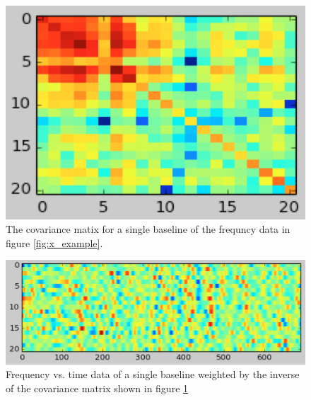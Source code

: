 \documentclass[twocolumn,numberedappendix]{emulateapj}
\begin{document}
\begin{figure}[h!]\centering
\includegraphics[width=\columnwidth, height=.8\columnwidth]{plots/C_example.png}
\caption{The covariance matix for a single baseline of the frequncy data in
figure \ref{fig:x_example}.} 
\label{fig:C_example}
\end{figure}

\begin{figure}[h!]\centering
\includegraphics[width=\columnwidth, height=.8\columnwidth]{plots/_Cx_example.png}
\caption{Frequency vs. time data of a single baseline weighted by the inverse of
the covariance matrix shown in figure \ref{fig:C_example}} 
\label{fig:_Cx_example}
\end{figure}
\end{document}
